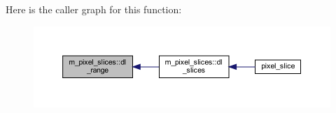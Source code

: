 Here is the caller graph for this function\+:
\nopagebreak
\begin{figure}[H]
\begin{center}
\leavevmode
\includegraphics[width=350pt]{namespacem__pixel__slices_a47408b6c6411a3c3cb3419b319e57978_icgraph}
\end{center}
\end{figure}
\mbox{\label{namespacem__pixel__slices_ac9e60bae24d6a1525af0da041bc1cf55}} 
